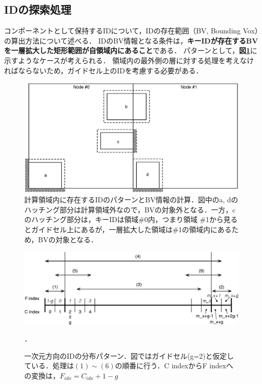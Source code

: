 %
\hypertarget{tgt:id search}{\subsection{IDの探索処理}}
\label{sec:id search}

コンポーネントとして保持するIDについて，IDの存在範囲（BV, Bounding Vox）の算出方法について述べる．
IDのBV情報となる条件は，\textbf{キーIDが存在するBVを一層拡大した矩形範囲が自領域内にあること}である．
パターンとして，\textbf{図\ref{fig:ID BV}}に示すようなケースが考えられる．
領域内の最外側の層に対する処理を考えなければならないため，ガイドセル上のIDを考慮する必要がある．

\begin{figure}[htbp]
\begin{center}
\includegraphics[width=13cm,clip]{IDsearch.eps}
\end{center}
\caption{計算領域内に存在するIDのパターンとBV情報の計算．図中のa, dのハッチング部分は計算領域外なので，BVの対象外となる．一方，cのハッチング部分は，キーIDは領域\#0内，つまり領域 \#1から見るとガイドセル上にあるが，一層拡大した領域は\#1の領域内にあるため，BVの対象となる．}
\label{fig:ID BV}
\end{figure}

\begin{figure}[htbp]
\begin{center}
\includegraphics[width=13cm,clip]{IDpattern.eps}
\end{center}
\caption{一次元方向のIDの分布パターン．図ではガイドセル(g=2)と仮定している．処理は$(1)\sim(6)$の順番に行う．C indexからF indexへの変換は，$F_{idx} = C_{idx}+1-g$}．
\label{fig:ID pattern}
\end{figure}

